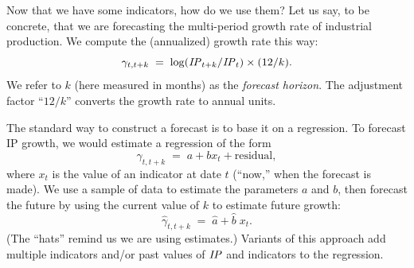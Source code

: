 \documentclass[letterpaper,12pt]{article}
\newcommand{\IP}{\mbox{\em IP\/}}
\begin{document}
Now that we have some indicators, how do we use them?  Let us say,
to be concrete, that we are forecasting  the multi-period growth
rate of industrial production. We compute the (annualized) growth
rate this way:
\[
    \gamma_{t,t+k} \;=\; \log (\IP_{t+k}/\IP_t) \times (12/k) .
\]
We refer to $k$ (here measured in months) as the {\it forecast
horizon\/}.  The adjustment factor ``$12/k$'' converts the growth
rate to annual units.

The standard way to construct a forecast is to base it on a
regression.  To forecast IP growth, we would estimate a regression
of the form
\[
        \gamma_{t,t+k}  \;=\;  a + b x_t + \mbox{residual},
\]
where $x_t$ is the value of an indicator at date $t$ (``now,''
when the forecast is made).  We use a sample of data to estimate
the parameters $a$ and $b$, then forecast the future by using the
current value of $k$ to estimate future growth:
\[
        \widehat{\gamma}_{t,t+k}  \;=\;  \widehat{a} + \widehat{b} \; x_t .
\]
(The ``hats'' remind us we are using estimates.)  Variants of this
approach add multiple indicators and/or past values of $\IP$ and
indicators to the regression.
\end{document}
